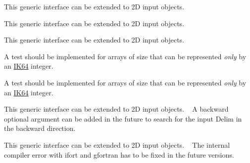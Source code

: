 \begin{DoxyRefList}
\item[Type \mbox{\hyperlink{interfaceArrayReverse__mod_1_1genReverse}{Array\+Reverse\+\_\+mod\+::gen\+Reverse}} ]\label{todo__todo000014}%
%
 This generic interface can be extended to 2D input objects. ~\newline
 
\item[Type \mbox{\hyperlink{interfaceArrayReverse__mod_1_1reverse}{Array\+Reverse\+\_\+mod\+::reverse}} ]\label{todo__todo000015}%
%
 This generic interface can be extended to 2D input objects. ~\newline
 
\item[Type \mbox{\hyperlink{interfaceArrayShuffle__mod_1_1shuffle}{Array\+Shuffle\+\_\+mod\+::shuffle}} ]\label{todo__todo000016}%
%
 This generic interface can be extended to 2D input objects. ~\newline
 
\item[Type \mbox{\hyperlink{interfaceArraySort__mod_1_1sort}{Array\+Sort\+\_\+mod\+::sort}} ]\label{todo__todo000017}%
%
 A test should be implemented for arrays of size that can be represented {\itshape only} by an \mbox{\hyperlink{namespaceConstants__mod_ad6aaf2f477491dc84e7ebbab3b64694e}{IK64}} integer. 
\item[Type \mbox{\hyperlink{interfaceArraySort__mod_1_1sortIndex}{Array\+Sort\+\_\+mod\+::sort\+Index}} ]\label{todo__todo000018}%
%
 A test should be implemented for arrays of size that can be represented {\itshape only} by an \mbox{\hyperlink{namespaceConstants__mod_ad6aaf2f477491dc84e7ebbab3b64694e}{IK64}} integer. 
\item[Type \mbox{\hyperlink{interfaceArraySplit__mod_1_1split}{Array\+Split\+\_\+mod\+::split}} ]\label{todo__todo000019}%
%
 This generic interface can be extended to 2D input objects. ~\newline
 A {\ttfamily backward} optional argument can be added in the future to search for the input {\ttfamily Delim} in the backward direction. ~\newline
 
\item[Type \mbox{\hyperlink{interfaceArrayUnique__mod_1_1genUnique}{Array\+Unique\+\_\+mod\+::gen\+Unique}} ]\label{todo__todo000020}%
%
 This generic interface can be extended to 2D input objects. ~\newline
 The internal compiler error with {\ttfamily ifort} and {\ttfamily gfortran} has to be fixed in the future versions. ~\newline
 

\end{DoxyRefList}
